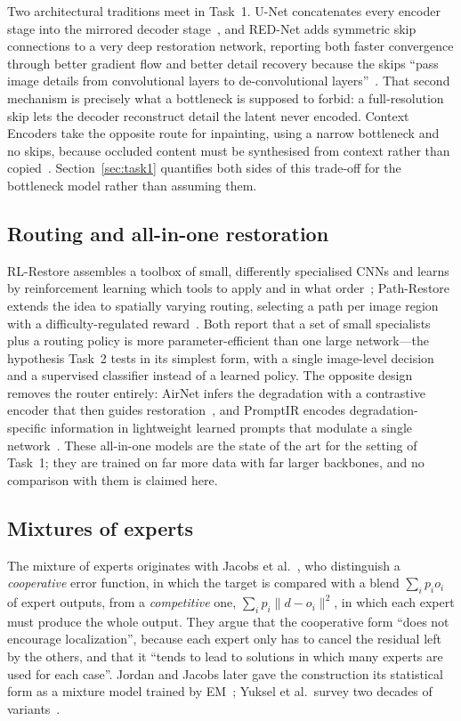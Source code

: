 \documentclass[conference]{IEEEtran}
\begin{document}
Two architectural traditions meet in Task~1. U-Net concatenates every encoder
stage into the mirrored decoder stage~\cite{ronneberger2015unet}, and RED-Net
adds symmetric skip connections to a very deep restoration network, reporting
both faster convergence through better gradient flow and better detail recovery
because the skips ``pass image details from convolutional layers to
de-convolutional layers''~\cite{mao2016image}. That second mechanism is precisely
what a bottleneck is supposed to forbid: a full-resolution skip lets the decoder
reconstruct detail the latent never encoded. Context Encoders take the opposite
route for inpainting, using a narrow bottleneck and no skips, because occluded
content must be synthesised from context rather than copied~\cite{pathak2016context}.
Section~\ref{sec:task1} quantifies both sides of this trade-off for the
bottleneck model rather than assuming them.

\subsection{Routing and all-in-one restoration}

RL-Restore assembles a toolbox of small, differently specialised CNNs and learns
by reinforcement learning which tools to apply and in what
order~\cite{yu2018crafting}; Path-Restore extends the idea to spatially varying
routing, selecting a path per image region with a difficulty-regulated
reward~\cite{yu2022path}. Both report that a set of small specialists plus a
routing policy is more parameter-efficient than one large network---the
hypothesis Task~2 tests in its simplest form, with a single image-level decision
and a supervised classifier instead of a learned policy. The opposite design
removes the router entirely: AirNet infers the degradation with a contrastive
encoder that then guides restoration~\cite{li2022allinone}, and PromptIR encodes
degradation-specific information in lightweight learned prompts that modulate a
single network~\cite{potlapalli2023promptir}. These all-in-one models are the
state of the art for the setting of Task~1; they are trained on far more data
with far larger backbones, and no comparison with them is claimed here.

\subsection{Mixtures of experts}

The mixture of experts originates with Jacobs et al.~\cite{jacobs1991adaptive},
who distinguish a \emph{cooperative} error function, in which the target is
compared with a blend $\sum_i p_i o_i$ of expert outputs, from a
\emph{competitive} one, $\sum_i p_i \lVert d - o_i \rVert^2$, in which each
expert must produce the whole output. They argue that the cooperative form
``does not encourage localization'', because each expert only has to cancel the
residual left by the others, and that it ``tends to lead to solutions in which
many experts are used for each case''. Jordan and Jacobs later gave the
construction its statistical form as a mixture model trained by
EM~\cite{jordan1994hierarchical}; Yuksel et al.\ survey two decades of
variants~\cite{yuksel2012twenty}.
\end{document}
